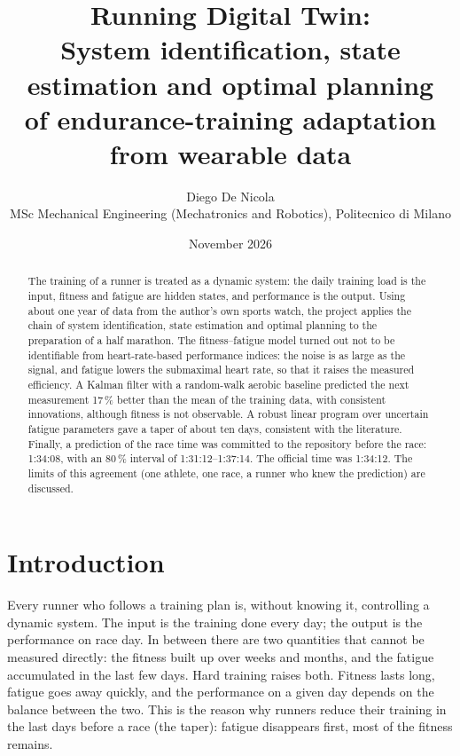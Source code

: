 \documentclass[11pt,a4paper]{article}
\title{Running Digital Twin:\\[4pt]
\large System identification, state estimation and optimal planning\\
of endurance-training adaptation from wearable data}
\author{Diego De Nicola\\
\small MSc Mechanical Engineering (Mechatronics and Robotics), Politecnico di Milano}
\date{November 2026}
\begin{document}
\maketitle

\begin{abstract}
The training of a runner is treated as a dynamic system: the daily training load
is the input, fitness and fatigue are hidden states, and performance is the
output. Using about one year of data from the author's own sports watch, the
project applies the chain of system identification, state estimation and
optimal planning to the preparation of a half marathon. The fitness--fatigue
model turned out not to be identifiable from heart-rate-based performance
indices: the noise is as large as the signal, and fatigue lowers the submaximal
heart rate, so that it raises the measured efficiency. A Kalman filter with a
random-walk aerobic baseline predicted the next measurement 17\,\% better than
the mean of the training data, with consistent innovations, although fitness is
not observable. A robust linear program over uncertain fatigue parameters gave a
taper of about ten days, consistent with the literature. Finally, a prediction of
the race time was committed to the repository before the race: 1:34:08, with an
80\,\% interval of 1:31:12--1:37:14. The official time was 1:34:12. The limits of
this agreement (one athlete, one race, a runner who knew the prediction) are
discussed.
\end{abstract}

\section{Introduction}\label{sec:intro}

Every runner who follows a training plan is, without knowing it, controlling a
dynamic system. The input is the training done every day; the output is the
performance on race day. In between there are two quantities that cannot be
measured directly: the fitness built up over weeks and months, and the fatigue
accumulated in the last few days. Hard training raises both. Fitness lasts
long, fatigue goes away quickly, and the performance on a given day depends on
the balance between the two. This is the reason why runners reduce their
training in the last days before a race (the taper): fatigue disappears first,
most of the fitness remains.
\end{document}
